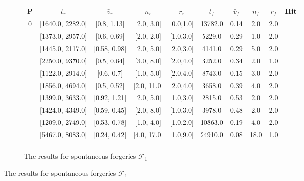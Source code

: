 \documentclass[a4paper, oneside]{csthesis}
\newcommand{\cmark}{\ding{51}}%
\newcommand{\xmark}{\ding{55}}%
\begin{document}
\begin{figure}
    \centering
    \begin{subfigure}[b]{\textwidth}
            \centering
            \tabcolsep 4pt
            \small
            \begin{tabular}{c|cccc||cccc||c}
            \hline
            \textbf{P} & $t_r$ & $\bar{v}_r$ & $n_r$ & $r_r$ & $t_f$ & $\bar{v}_f$ & $n_f$ & $r_f$ & Hit \\
            \hline
            0 & [1640.0, 2282.0] & [0.8, 1.13] & [2.0, 3.0] & [0.0,1.0] & 13782.0 & 0.14 & 2.0 & 2.0 & \xmark \\ \hdashline[0.5pt/3pt]
            1 & [1373.0, 2957.0] & [0.6, 0.69] & [2.0, 2.0] & [1.0,3.0] & 5229.0 & 0.29 & 1.0 & 2.0 & \xmark\\ \hdashline[0.5pt/3pt]
            2 & [1445.0, 2117.0] & [0.58, 0.98] & [2.0, 5.0] & [2.0,3.0] & 4141.0 & 0.29 & 5.0 & 2.0 & \xmark\\ \hdashline[0.5pt/3pt]
            3 & [2250.0, 9370.0] & [0.5, 0.64] & [3.0, 8.0] & [2.0,4.0] & 3252.0 & 0.34 & 2.0 & 1.0 & \xmark \\ \hdashline[0.5pt/3pt]
            4 & [1122.0, 2914.0] & [0.6, 0.7] & [1.0, 5.0] & [2.0,4.0] & 8743.0 & 0.15 & 3.0 & 2.0 & \xmark \\ \hdashline[0.5pt/3pt]
            5 & [1856.0, 4694.0] & [0.5, 0.52] & [2.0, 11.0] & [2.0,4.0] & 3658.0 & 0.39 & 4.0 & 2.0 & \xmark \\ \hdashline[0.5pt/3pt]
            6 & [1399.0, 3633.0] & [0.92, 1.21] & [2.0, 5.0] & [1.0,3.0] & 2815.0 & 0.53 & 2.0 & 2.0 & \xmark \\ \hdashline[0.5pt/3pt]
            7 & [1424.0, 4349.0] & [0.59, 0.45] & [2.0, 8.0] & [1.0,3.0] & 3978.0 & 0.48 & 2.0 & 2.0 & \cmark \\ \hdashline[0.5pt/3pt]
            8 & [1209.0, 2749.0] & [0.53, 0.78] & [1.0, 4.0] & [1.0,2.0] & 10863.0 & 0.19 & 4.0 & 2.0 & \xmark \\ \hdashline[0.5pt/3pt]
            9 & [5467.0, 8083.0] & [0.24, 0.42] & [4.0, 17.0] & [1.0,9.0] & 24910.0 & 0.08 & 18.0 & 1.0 & \xmark \\ \hdashline[0.5pt/3pt]
            \hline
            \end{tabular}
            \label{tbl:global-features-forg-spontaneous}
            \caption{The results for spontaneous forgeries $\mathcal{F}_1$}
    \end{subfigure}%


\end{figure}
\end{document}
